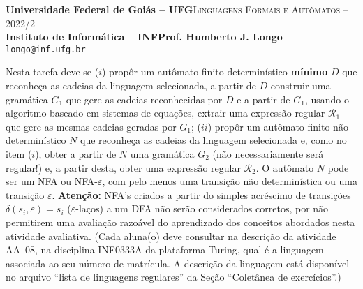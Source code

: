 \documentclass[12pt]{article}
\def\ua{08}
\begin{document}
 \begin{tcolorbox}[rounded corners, colback=blue!3, colframe=blue!40!black]
  \footnotesize\textbf{Universidade Federal de Goiás -- UFG}\hfill \textsc{Linguagens Formais e Autômatos -- 2022/2}\\
  \footnotesize\textbf{Instituto de Informática -- INF\hfill Prof. Humberto J. Longo} -- \scriptsize\texttt{longo@inf.ufg.br}
 \end{tcolorbox}\bigskip
%
\begin{tcolorbox}[rounded corners, colback=blue!2, colframe=blue!40!black, title=\textbf{Atividade AA-\ua}]
  Nesta tarefa deve-se ($i$) propôr um autômato finito determinístico \textbf{mínimo} $D$ que reconheça as cadeias da linguagem selecionada, a partir de $D$ construir uma gramática $G_1$ que gere as cadeias reconhecidas por $D$ e a partir de $G_1$, usando o algoritmo baseado em sistemas de equações, extrair uma expressão regular $\mathcal{R}_1$ que gere as mesmas cadeias geradas por $G_1$; ($ii$) propôr um autômato finito não-determinístico $N$ que reconheça as cadeias da linguagem selecionada e, como no item ($i$), obter a partir de $N$ uma gramática $G_2$ (não necessariamente será regular!) e, a partir desta, obter uma expressão regular $\mathcal{R}_2$. O autômato $N$ pode ser um NFA ou NFA-$\varepsilon$, com pelo menos uma transição não determinística ou uma transição $\varepsilon$. \textbf{Atenção:} NFA's criados a partir do simples acréscimo de transições $\delta(s_i,\varepsilon)=s_i$ ($\varepsilon$-laços) a um DFA não serão considerados corretos, por não permitirem uma avaliação razoável do aprendizado dos conceitos abordados nesta atividade avaliativa. (Cada aluna(o) deve consultar na descrição da atividade AA--\ua, na disciplina INF0333A da plataforma Turing, qual é a linguagem associada ao seu número de matrícula. A descrição da linguagem está disponível no arquivo ``lista de linguagens regulares'' da Seção ``Coletânea de exercícios''.)
\end{tcolorbox}\bigskip
\end{document}
